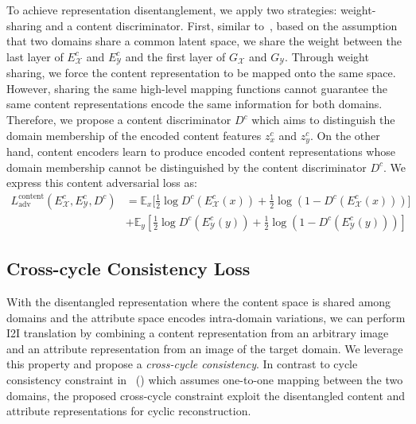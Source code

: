 \documentclass[runningheads]{llncs}
\begin{document}
To achieve representation disentanglement, we apply two strategies: weight-sharing and a content discriminator.
%
First, similar to~\cite{liu2017unit}, based on the assumption that two domains share a common latent space, we share the weight between the last layer of $E^c_\mathcal{X}$ and $E^c_\mathcal{Y}$ and the first layer of $G_\mathcal{X}$ and $G_\mathcal{Y}$.
%
Through weight sharing, we force the content representation to be mapped onto the same space.
However, sharing the same high-level mapping functions cannot guarantee the same content representations encode the same information for both domains.
%
Therefore, we propose a content discriminator $D^c$ which aims to distinguish the domain membership of the encoded content features $z_x^{c}$ and $z_y^{c}$.
%
On the other hand, content encoders learn to produce encoded content representations whose domain membership cannot be distinguished by the content discriminator $D^c$.
%
We express this content adversarial loss as:
\vspace{\eqmargin}
\begin{equation}
\begin{aligned}
L_{\mathrm{adv}}^{\mathrm{content}}(E^c_\mathcal{X},E^c_\mathcal{Y}, D^c) &= \mathbb{E}_{x}[\frac{1}{2}\log{D^c(E^c_\mathcal{X}(x))}+\frac{1}{2}\log{(1-D^c(E^c_\mathcal{X}(x)))]}\\  &+ \mathbb{E}_{y}[\frac{1}{2}\log{D^c(E^c_\mathcal{Y}(y))}+\frac{1}{2}\log{(1-D^c(E^c_\mathcal{Y}(y)))}]
\end{aligned}
\end{equation}
\vspace{\eqmargin}
\vspace{\eqmargin}

\vspace{\subsecmargin}
\subsection{Cross-cycle Consistency Loss}
\label{subsec:crosscycle}
\vspace{\subsecmargin}
%
With the disentangled representation where the content space is shared among domains and the attribute space encodes intra-domain variations, we can perform I2I translation by combining a content representation from an arbitrary image and an attribute representation from an image of the target domain.
%
We leverage this property and propose a \textit{cross-cycle consistency}.
%
In contrast to cycle consistency constraint in~\cite{zhu2017cyclegan} () which assumes one-to-one mapping between the two domains, the proposed cross-cycle constraint exploit the disentangled content and attribute representations for cyclic reconstruction.
%
\end{document}

